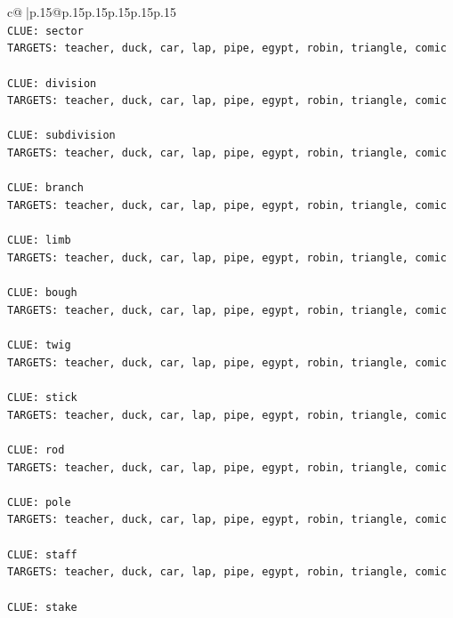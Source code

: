 \documentclass{article}
\begin{document}
{\begin{supertabular}{c@{$\;$}|p{.15\linewidth}@{}p{.15\linewidth}p{.15\linewidth}p{.15\linewidth}p{.15\linewidth}p{.15\linewidth}}
{{{\\ 
\texttt{CLUE: sector} \\
\texttt{TARGETS: teacher, duck, car, lap, pipe, egypt, robin, triangle, comic} \\
\\ 
\texttt{CLUE: division} \\
\texttt{TARGETS: teacher, duck, car, lap, pipe, egypt, robin, triangle, comic} \\
\\ 
\texttt{CLUE: subdivision} \\
\texttt{TARGETS: teacher, duck, car, lap, pipe, egypt, robin, triangle, comic} \\
\\ 
\texttt{CLUE: branch} \\
\texttt{TARGETS: teacher, duck, car, lap, pipe, egypt, robin, triangle, comic} \\
\\ 
\texttt{CLUE: limb} \\
\texttt{TARGETS: teacher, duck, car, lap, pipe, egypt, robin, triangle, comic} \\
\\ 
\texttt{CLUE: bough} \\
\texttt{TARGETS: teacher, duck, car, lap, pipe, egypt, robin, triangle, comic} \\
\\ 
\texttt{CLUE: twig} \\
\texttt{TARGETS: teacher, duck, car, lap, pipe, egypt, robin, triangle, comic} \\
\\ 
\texttt{CLUE: stick} \\
\texttt{TARGETS: teacher, duck, car, lap, pipe, egypt, robin, triangle, comic} \\
\\ 
\texttt{CLUE: rod} \\
\texttt{TARGETS: teacher, duck, car, lap, pipe, egypt, robin, triangle, comic} \\
\\ 
\texttt{CLUE: pole} \\
\texttt{TARGETS: teacher, duck, car, lap, pipe, egypt, robin, triangle, comic} \\
\\ 
\texttt{CLUE: staff} \\
\texttt{TARGETS: teacher, duck, car, lap, pipe, egypt, robin, triangle, comic} \\
\\ 
\texttt{CLUE: stake} \\
}}}
\end{supertabular}}
\end{document}
